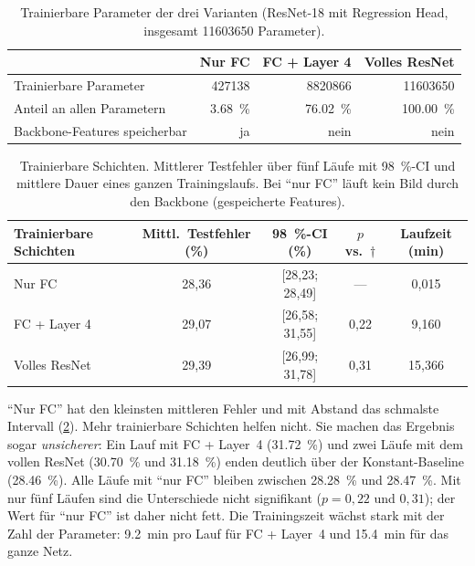 \begin{table}[htbp]
  \centering
  \caption{Trainierbare Parameter der drei Varianten
           (ResNet-18 mit Regression Head, insgesamt \num{11603650}
           Parameter).}
  \label{tab:params}
  \small
  \begin{tabular}{lrrr}
    \toprule
    & Nur FC & FC + Layer 4 & Volles ResNet \\
    \midrule
    Trainierbare Parameter         & \num{427138} & \num{8820866} & \num{11603650} \\
    Anteil an allen Parametern     & \SI{3,68}{\percent} & \SI{76,02}{\percent} & \SI{100,00}{\percent} \\
    Backbone-Features speicherbar  & ja & nein & nein \\
    \bottomrule
  \end{tabular}
\end{table}

\begin{table}[htbp]
  \centering
  \caption[Trainierbare Schichten]{Trainierbare Schichten. Mittlerer Testfehler über fünf Läufe mit
           \SI{98}{\percent}-CI und mittlere Dauer eines ganzen
           Trainingslaufs. Bei \enquote{nur FC} läuft kein Bild durch den
           Backbone (gespeicherte Features).}
  \label{tab:layers}
  \small
  \begin{tabular}{lcccc}
    \toprule
    Trainierbare Schichten & Mittl.\ Testfehler (\%) & \SI{98}{\percent}-CI (\%) & $p$ vs.\ $\dagger$ & Laufzeit (min) \\
    \midrule
    Nur FC\sel{}           & 28,36 & [28,23; 28,49] & ---  & 0,015 \\
    FC + Layer 4           & 29,07 & [26,58; 31,55] & 0,22 & 9,160 \\
    Volles ResNet          & 29,39 & [26,99; 31,78] & 0,31 & 15,366 \\
    \bottomrule
  \end{tabular}
\end{table}

\enquote{Nur FC} hat den kleinsten mittleren Fehler und mit Abstand das
schmalste Intervall (\cref{tab:layers}). Mehr trainierbare Schichten helfen
nicht. Sie machen das Ergebnis sogar \emph{unsicherer}: Ein Lauf mit FC +
Layer~4 (\SI{31,72}{\percent}) und zwei Läufe mit dem vollen ResNet
(\SI{30,70}{\percent} und \SI{31,18}{\percent}) enden deutlich über der
Konstant-Baseline (\SI{28,46}{\percent}). Alle Läufe mit \enquote{nur FC}
bleiben zwischen \SI{28,28}{\percent} und \SI{28,47}{\percent}. Mit nur fünf
Läufen sind die Unterschiede nicht signifikant ($p=0,22$ und $0,31$); der Wert
für \enquote{nur FC} ist daher nicht fett. Die Trainingszeit wächst stark mit
der Zahl der Parameter: \SI{9,2}{\minute} pro Lauf für FC + Layer~4 und
\SI{15,4}{\minute} für das ganze Netz.

